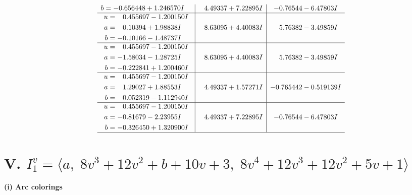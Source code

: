 \documentclass[1p]{elsarticle_modified}
\theoremstyle{definition}
\begin{document}
$$\begin{array}{c|c|c}
\begin{aligned}
b &= -0.656448 + 1.246570 I\end{aligned}
 & \phantom{-}4.49337 + 7.22895 I & -0.76544 - 6.47803 I \\ \hline\begin{aligned}
u &= \phantom{-}0.455697 - 1.200150 I \\
a &= \phantom{-}0.10394 + 1.98838 I \\
b &= -0.10166 - 1.48737 I\end{aligned}
 & \phantom{-}8.63095 + 4.40083 I & \phantom{-}5.76382 - 3.49859 I \\ \hline\begin{aligned}
u &= \phantom{-}0.455697 - 1.200150 I \\
a &= -1.58034 - 1.28725 I \\
b &= -0.222841 + 1.200460 I\end{aligned}
 & \phantom{-}8.63095 + 4.40083 I & \phantom{-}5.76382 - 3.49859 I \\ \hline\begin{aligned}
u &= \phantom{-}0.455697 - 1.200150 I \\
a &= \phantom{-}1.29027 + 1.88553 I \\
b &= \phantom{-}0.052319 - 1.112940 I\end{aligned}
 & \phantom{-}4.49337 + 1.57271 I & -0.765442 - 0.519139 I \\ \hline\begin{aligned}
u &= \phantom{-}0.455697 - 1.200150 I \\
a &= -0.81679 - 2.23955 I \\
b &= -0.326450 + 1.320900 I\end{aligned}
 & \phantom{-}4.49337 + 7.22895 I & -0.76544 - 6.47803 I\\
 \hline 
 \end{array}$$\newpage\newpage\renewcommand{\arraystretch}{1}
\centering \section*{V. $I^v_{1}= \langle a,\;8 v^3+12 v^2+b+10 v+3,\;8 v^4+12 v^3+12 v^2+5 v+1 \rangle$}
\flushleft \textbf{(i) Arc colorings}\\
\end{document}
